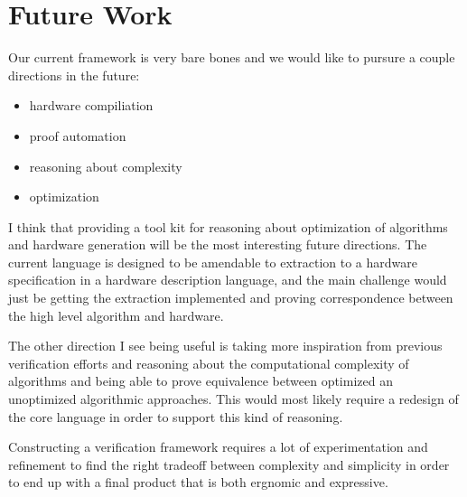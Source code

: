 \section{Future Work}
Our current framework is very bare bones and we would like to pursure a couple
directions in the future:\\

\begin{itemize}
    \item hardware compiliation
    \item proof automation
    \item reasoning about complexity
    \item optimization\\
\end{itemize}

I think that providing a tool kit for reasoning about optimization of algorithms
and hardware generation will be the most interesting future directions. The current
language is designed to be amendable to extraction to a hardware specification
in a hardware description language, and the main challenge would just be getting
the extraction implemented and proving correspondence between the high level
algorithm and hardware.

The other direction I see being useful is taking more inspiration from previous
verification efforts and reasoning about the computational complexity of
algorithms and being able to prove equivalence between optimized an unoptimized
algorithmic approaches. This would most likely require a redesign of the core
language in order to support this kind of reasoning.

Constructing a verification framework requires a lot of experimentation and refinement
to find the right tradeoff between complexity and simplicity in order to end
up with a final product that is both ergnomic and expressive.
